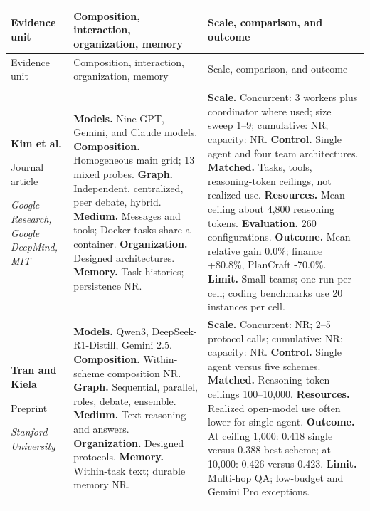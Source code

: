 \begin{longtable}{@{}>{\raggedright\arraybackslash}p{}>{\raggedright\arraybackslash}p{}>{\raggedright\arraybackslash}p{}@{}}
\toprule
Evidence unit & Composition, interaction, organization, memory & Scale, comparison, and outcome \\
\midrule
\endfirsthead
\toprule
Evidence unit & Composition, interaction, organization, memory & Scale, comparison, and outcome \\
\midrule
\endhead
\midrule
\multicolumn{3}{r}{Continued on next page}\\
\endfoot
\bottomrule
\endlastfoot
\textbf{Kim et al.}\par \citep{kim-scaling-agent-systems}\par Journal article\par\emph{Google Research, Google DeepMind, MIT} & \textbf{Models.} Nine GPT, Gemini, and Claude models. \textbf{Composition.} Homogeneous main grid; 13 mixed probes. \textbf{Graph.} Independent, centralized, peer debate, hybrid. \textbf{Medium.} Messages and tools; Docker tasks share a container. \textbf{Organization.} Designed architectures. \textbf{Memory.} Task histories; persistence NR. & \textbf{Scale.} Concurrent: 3 workers plus coordinator where used; size sweep 1--9; cumulative: NR; capacity: NR. \textbf{Control.} Single agent and four team architectures. \textbf{Matched.} Tasks, tools, reasoning-token ceilings, not realized use. \textbf{Resources.} Mean ceiling about 4,800 reasoning tokens. \textbf{Evaluation.} 260 configurations. \textbf{Outcome.} Mean relative gain 0.0\%; finance +80.8\%, PlanCraft -70.0\%. \textbf{Limit.} Small teams; one run per cell; coding benchmarks use 20 instances per cell. \\ \addlinespace[5pt]
\textbf{Tran and Kiela}\par \citep{tran-kiela-equal-budget}\par Preprint\par\emph{Stanford University} & \textbf{Models.} Qwen3, DeepSeek-R1-Distill, Gemini 2.5. \textbf{Composition.} Within-scheme composition NR. \textbf{Graph.} Sequential, parallel, roles, debate, ensemble. \textbf{Medium.} Text reasoning and answers. \textbf{Organization.} Designed protocols. \textbf{Memory.} Within-task text; durable memory NR. & \textbf{Scale.} Concurrent: NR; 2--5 protocol calls; cumulative: NR; capacity: NR. \textbf{Control.} Single agent versus five schemes. \textbf{Matched.} Reasoning-token ceilings 100--10,000. \textbf{Resources.} Realized open-model use often lower for single agent. \textbf{Outcome.} At ceiling 1,000: 0.418 single versus 0.388 best scheme; at 10,000: 0.426 versus 0.423. \textbf{Limit.} Multi-hop QA; low-budget and Gemini Pro exceptions. \\ \addlinespace[5pt]

\end{longtable}
